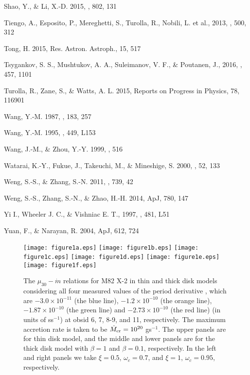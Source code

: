 \documentclass[12pt,preprint]{aastex}
\begin{document}
\begin{thebibliography}{28}
Shao, Y., \& Li, X.-D. 2015, \apj, 802, 131

Tiengo, A., Esposito, P., Mereghetti, S., Turolla, R., Nobili, L. et al., 2013, \nat, 500, 312

Tong, H. 2015, Res. Astron. Astroph., 15, 517

Tsygankov, S. S., Mushtukov, A. A., Suleimanov, V. F., \& Poutanen, J., 2016, \mnras, 457, 1101

Turolla, R., Zane, S., \& Watts, A. L. 2015, Reports on Progress in Physics, 78, 116901

Wang, Y.-M. 1987, \aap, 183, 257

Wang, Y.-M. 1995, \apjl, 449, L153

Wang, J.-M., \& Zhou, Y.-Y. 1999, \apj, 516

Watarai, K.-Y., Fukue, J., Takeuchi, M., \& Mineshige, S. 2000, \pasj, 52, 133

Weng, S.-S., \& Zhang, S.-N. 2011, \apj, 739, 42

Weng, S.-S., Zhang, S.-N., \& Zhao, H.-H. 2014, ApJ, 780, 147

Yi I., Wheeler J. C., \& Vishniac E. T., 1997, \apj, 481, L51

Yuan, F., \& Narayan, R. 2004, ApJ, 612, 724

\end{thebibliography}

\newpage

\begin{figure}
\centering
\texttt{[image: figure1a.eps]}
\texttt{[image: figure1b.eps]}
\texttt{[image: figure1c.eps]}
\texttt{[image: figure1d.eps]}
\texttt{[image: figure1e.eps]}
\texttt{[image: figure1f.eps]}
\caption{The $\mu_{30}-\dot{m}$ relations for M82 X-2 in thin and thick disk models considering all four measured values of the period derivative \citep{bhw2014}, which are $-3.0\times 10^{-11}$ (the blue line), $-1.2\times 10^{-10}$ (the orange line), $-1.87\times 10^{-10}$ (the green line) and $-2.73\times 10^{-10}$ (the red line) (in units of ss$^{-1}$) at obsid 6, 7, 8-9, and 11, respectively. The maximum accretion rate is taken to be $\dot{M}_{\rm cr}=10^{20}$ gs$^{-1}$.
The upper panels are for thin disk model, and the middle and lower panels are for the thick disk model with $\beta=1$ and $\beta=0.1$, respectively. In the left and right panels we take $\xi=0.5$, $\omega_c=0.7$, and $\xi=1$, $\omega_c=0.95$, respectively.
}
\label{fig:pyra}
\end{figure}
\end{document}
